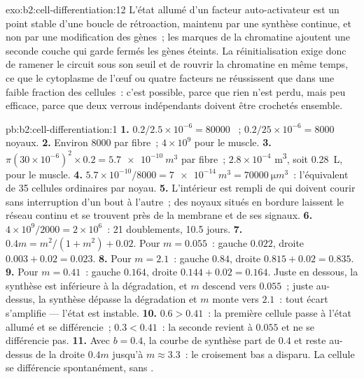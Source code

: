 \begin{solution}{exo:b2:cell-differentiation:12}
L'état allumé d'un facteur auto-activateur est un point stable d'une
boucle de rétroaction, maintenu par une synthèse continue, et non par
une modification des gènes~; les marques de la chromatine ajoutent une
seconde couche qui garde fermés les gènes éteints. La réinitialisation
exige donc de ramener le circuit sous son seuil et de rouvrir la
chromatine en même temps, ce que le cytoplasme de l'œuf ou quatre
facteurs ne réussissent que dans une faible fraction des cellules~:
c'est possible, parce que rien n'est perdu, mais peu efficace, parce
que deux verrous indépendants doivent être crochetés ensemble.
\end{solution}

\begin{solution}{pb:b2:cell-differentiation:1}
\textbf{1.} $0.2/2.5\times 10^{-6} = \num{80000}$ ~;
$0.2/25\times 10^{-6} = \num{8000}$ noyaux.
\textbf{2.} Environ \num{8000} par fibre~; $4\times 10^{9}$ pour le
muscle.
\textbf{3.} $\pi(30\times 10^{-6})^{2}\times 0.2 = \qty{5.7e-10}{m^3}$
par fibre~; $2.8\times 10^{-4}$ \unit{m^3}, soit \qty{0.28}{L}, pour le
muscle.
\textbf{4.} $5.7\times 10^{-10}/8000 = \qty{7e-14}{m^3} =
\qty{70000}{\micro m^3}$~: l'équivalent de 35 cellules ordinaires par
noyau.
\textbf{5.} L'intérieur est rempli de  qui doivent courir
sans interruption d'un bout à l'autre~; des noyaux situés en bordure
laissent le réseau continu et se trouvent près de la membrane et de ses
signaux.
\textbf{6.} $4\times 10^{9}/2000 = 2\times 10^{6}$~: 21 doublements,
10.5 jours.
\textbf{7.} $0.4m = m^{2}/(1 + m^{2}) + 0.02$. Pour $m = 0.055$~:
gauche $0.022$, droite $0.003 + 0.02 = 0.023$.
\textbf{8.} Pour $m = 2.1$~: gauche $0.84$, droite $0.815 + 0.02 = 0.835$.
\textbf{9.} Pour $m = 0.41$~: gauche $0.164$, droite $0.144 + 0.02 = 0.164$.
Juste en dessous, la synthèse est inférieure à la dégradation, et $m$
descend vers $0.055$~; juste au-dessus, la synthèse dépasse la
dégradation et $m$ monte vers $2.1$~: tout écart s'amplifie --- l'état
est instable.
\textbf{10.} $0.6 > 0.41$~: la première cellule passe à l'état allumé et
se différencie~; $0.3 < 0.41$~: la seconde revient à $0.055$ et ne se
différencie pas.
\textbf{11.} Avec $b = 0.4$, la courbe de synthèse part de $0.4$ et
reste au-dessus de la droite $0.4m$ jusqu'à $m \approx 3.3$~: le
croisement bas a disparu. La cellule se différencie spontanément, sans
.

\end{solution}
